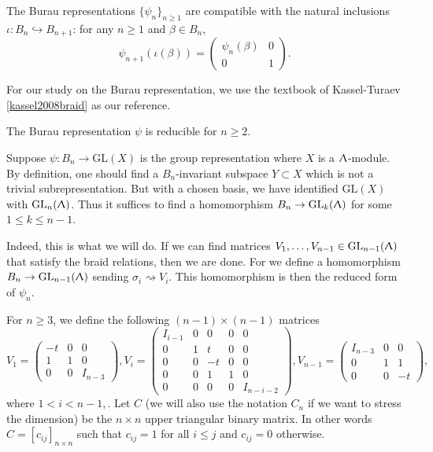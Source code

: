 \begin{remark}
\label{sec:burau-representation-7}
The Burau representations $\{ \psi_n \}_{n\geq 1}$ are compatible with the natural inclusions $\iota : B_n \hookrightarrow B_{n+1}$: for any $n\geq 1 $ and $\beta \in B_n$, 
\begin{equation}
\label{1:eq:3}
\psi_{n+1}(\iota(\beta)) = \begin{pmatrix} \psi_n(\beta) & 0 \\ 0 & 1 \end{pmatrix}.
\end{equation}

\end{remark}

For our study on the Burau representation, we use the textbook of Kassel-Turaev \ref{kassel2008braid} as our reference.

\begin{theorem}
\label{sec:burau-representation-8}
  The Burau representation $\psi$ is reducible for $n\geq 2$.
\end{theorem} 

  Suppose $\psi : B_n \to \text{GL}(X)$ is the group representation where $X$ is a $\Uplambda$-module. By definition, one should find a $B_n$-invariant subspace $Y \subset X$ which is not a trivial subrepresentation. But with a chosen basis, we have identified $\text{GL}(X)$ with $\text{GL}_n(\Uplambda)$. Thus it suffices to find a homomorphism $B_n \to \text{GL}_k(\Uplambda)$ for some $1 \leq k \leq n-1$.

  Indeed, this is what we will do. If we can find matrices $V_1, \ldots, V_{n-1} \in \text{GL}_{n-1}(\Uplambda)$ that satisfy the braid relations, then we are done. For we define a homomorphism $B_n \to \text{GL}_{n-1}(\Uplambda)$ sending $\sigma_i \rightsquigarrow V_i$. This homomorphism is then the reduced form of $\psi_n$.

  For $n\geq 3$, we define the following $(n-1)\times(n-1)$ matrices 
\begin{displaymath}
  V_1 = \begin{pmatrix} -t & 0 & 0 \\ 1 & 1 & 0 \\ 0 & 0 & I_{n-3} \end{pmatrix},
  V_i = \begin{pmatrix} I_{i-1} & 0 & 0 & 0  & 0 \\ 0 & 1 & t & 0 & 0 \\ 0 & 0 & -t & 0 & 0 \\0 & 0 & 1 & 1 & 0 \\ 0 & 0 & 0 & 0 & I_{n-i-2} \end{pmatrix},
  V_{n-1} = \begin{pmatrix} I_{n-3} & 0 & 0 \\ 0 & 1 & 1 \\ 0 & 0 & -t \end{pmatrix},
\end{displaymath}
where $1 < i < n-1,$. Let $C$ (we will also use the notation $C_n$ if we want to stress the dimension) be the $n\times n$ upper triangular binary matrix. In other words $C = [c_{ij}]_{n\times n}$ such that $c_{ij} = 1$ for all $i \leq j$ and $c_{ij} = 0$ otherwise.

